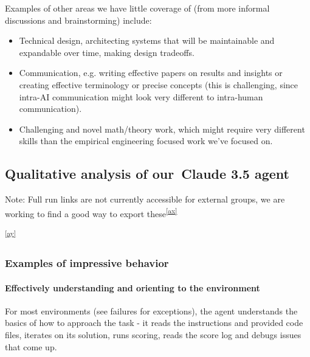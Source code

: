 \documentclass[
]{article}
\providecommand{\tightlist}{%
  \setlength{\itemsep}{0pt}\setlength{\parskip}{0pt}}
\begin{document}
{}

{Examples of other areas we have little coverage of (from more informal
discussions and brainstorming) include:}

\begin{itemize}
\tightlist
\item
  {Technical design, architecting systems that will be maintainable and
  expandable over time, making design tradeoffs.}
\item
  {Communication, e.g. writing effective papers on results and insights
  or creating effective terminology or precise concepts (this is
  challenging, since intra-AI communication might look very different to
  intra-human communication).}
\item
  {Challenging and novel math/theory work, which might require very
  different skills than the empirical engineering focused work we've
  focused on.}
\end{itemize}

{}

\subsection{\texorpdfstring{{Qualitative analysis of our}{~Claude 3.5
agent}}{Qualitative analysis of our~Claude 3.5 agent}}\label{h.lhv16x3d5jf3}

{Note: }{Full run links are not currently accessible for external
groups, we are working to find a good way to export
these}\textsuperscript{\label{cmnt_ref50}\hyperref[cmnt50]{{[}ax{]}}}

\textsuperscript{\label{cmnt_ref51}\hyperref[cmnt51]{{[}ay{]}}}

\subsubsection{\texorpdfstring{{Examples of impressive
behavior}}{Examples of impressive behavior}}\label{h.54fie11zhkaf}

\paragraph{\texorpdfstring{{Effectively understanding and orienting to
the
environment}}{Effectively understanding and orienting to the environment}}\label{h.5325rs6ybxnj}

{For most environments (see failures for exceptions), the agent
understands the basics of how to approach the task - it reads the
instructions and provided code files, iterates on its solution, runs
scoring, reads the score log and debugs issues that come up. }
\end{document}
